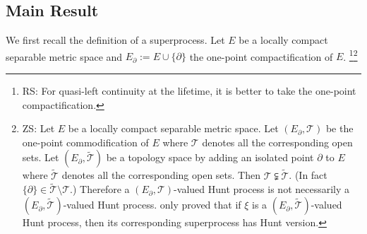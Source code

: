 \documentclass[12pt,a4paper]{amsart}
\numberwithin{equation}{section}
\theoremstyle{plain}
\theoremstyle{definition}
\theoremstyle{remark}
\begin{document}
\subsection{Main Result}\label{sec:M}
	We first recall the definition of a superprocess. 
	Let $E$ be a locally compact separable metric space and $E_\partial := E \cup \{\partial\}$ the one-point compactification of $E$. \footnote{RS: For quasi-left continuity at the lifetime, it is better to take the one-point compactification.}\footnote{ZS: Let $E$ be a locally compact separable metric space. Let $(E_\partial, \mathcal T)$ be the one-point commodification of $E$ where $\mathcal T$ denotes all the corresponding open sets. Let $(E_\partial, \widetilde{\mathcal T})$ be a topology space by adding an isolated point $\partial$ to $E$ where $\widetilde{\mathcal T}$ denotes all the corresponding open sets. Then $\mathcal T \subsetneqq \widetilde {\mathcal T}$. (In fact $\{\partial\} \in \widetilde{\mathcal T}\setminus \mathcal T$.) Therefore a $(E_\partial,\mathcal T)$-valued Hunt process is not  necessarily a $(E_\partial,\widetilde{\mathcal T})$-valued Hunt process. \cite[Theorem 5.11]{Li2011Measure-valued} only proved that if $\xi$ is a $(E_\partial,\widetilde{\mathcal T})$-valued Hunt process, then its corresponding superprocess has Hunt version.}  %
\end{document}
